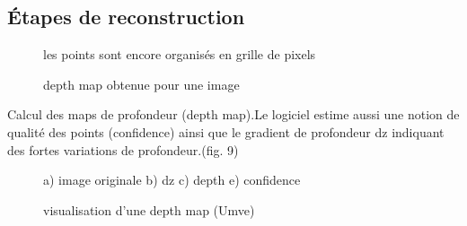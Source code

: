 \documentclass[a4paper,10pt,french]{sphinxhowto}
\begin{document}
\subsection{\textbf{Étapes de reconstruction}}
\label{mvs:etapes-de-reconstruction}\begin{figure}[htbp]
\centering
\capstart

\caption{depth map obtenue pour une image}{\small 
les points sont encore organisés en grille de pixels
}\end{figure}

Calcul des maps de profondeur (depth map).Le logiciel estime aussi une notion de qualité des points (confidence) ainsi que le gradient de profondeur dz indiquant des fortes variations de profondeur.(fig. 9)
\begin{figure}[htbp]
\centering
\capstart

\caption{visualisation d'une depth map (Umve)}{\small 
a) image originale b) dz
c) depth           e) confidence
}\end{figure}
\end{document}

